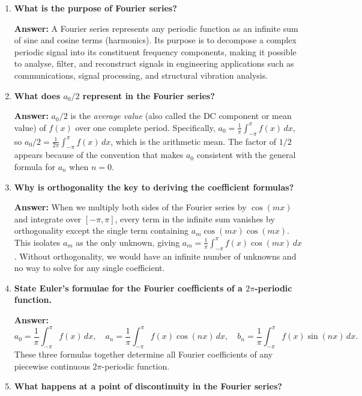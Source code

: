 \documentclass[12pt,a4paper]{article}
\begin{document}
\begin{enumerate}[label=\textbf{Q\arabic*.}]

\item \textbf{What is the purpose of Fourier series?}

\textbf{Answer:} A Fourier series represents any periodic function as an infinite sum of sine and cosine terms (harmonics).
Its purpose is to decompose a complex periodic signal into its constituent frequency components, making it possible to analyse, filter, and reconstruct signals in engineering applications such as communications, signal processing, and structural vibration analysis.

\item \textbf{What does $a_0/2$ represent in the Fourier series?}

\textbf{Answer:} $a_0/2$ is the \emph{average value} (also called the DC component or mean value) of $f(x)$ over one complete period.
Specifically, $a_0 = \frac{1}{\pi}\int_{-\pi}^{\pi}f(x)\,dx$, so $a_0/2 = \frac{1}{2\pi}\int_{-\pi}^{\pi}f(x)\,dx$, which is the arithmetic mean.
The factor of $1/2$ appears because of the convention that makes $a_0$ consistent with the general formula for $a_n$ when $n = 0$.

\item \textbf{Why is orthogonality the key to deriving the coefficient formulas?}

\textbf{Answer:} When we multiply both sides of the Fourier series by $\cos(mx)$ and integrate over $[-\pi,\pi]$, every term in the infinite sum vanishes by orthogonality except the single term containing $a_m\cos(mx)\cos(mx)$.
This isolates $a_m$ as the only unknown, giving $a_m = \frac{1}{\pi}\int_{-\pi}^{\pi}f(x)\cos(mx)\,dx$.
Without orthogonality, we would have an infinite number of unknowns and no way to solve for any single coefficient.

\item \textbf{State Euler's formulae for the Fourier coefficients of a $2\pi$-periodic function.}

\textbf{Answer:}
\[
a_0 = \frac{1}{\pi}\int_{-\pi}^{\pi}f(x)\,dx, \quad
a_n = \frac{1}{\pi}\int_{-\pi}^{\pi}f(x)\cos(nx)\,dx, \quad
b_n = \frac{1}{\pi}\int_{-\pi}^{\pi}f(x)\sin(nx)\,dx.
\]
These three formulas together determine all Fourier coefficients of any piecewise continuous $2\pi$-periodic function.

\item \textbf{What happens at a point of discontinuity in the Fourier series?}


\end{enumerate}
\end{document}
